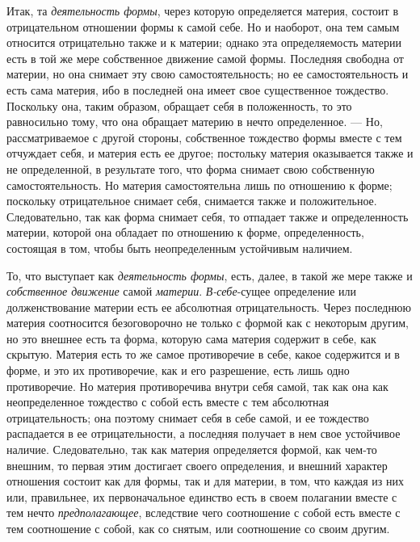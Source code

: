 Итак, та {\em деятельность формы}, через которую
определяется материя, состоит в отрицательном отношении формы к самой себе.
Но и наоборот, она тем самым относится отрицательно также и к материи;
однако эта определяемость материи есть в той же мере собственное движение
самой формы. Последняя свободна от материи, но она снимает эту свою
самостоятельность; но ее самостоятельность и есть сама материя, ибо в
последней она имеет свое существенное тождество. Поскольку она, таким
образом, обращает себя в положенность, то это равносильно тому, что она
обращает материю в нечто определенное. — Но, рассматриваемое с другой
стороны, собственное тождество формы вместе с тем отчуждает себя, и материя
есть ее другое; постольку материя оказывается также и не определенной, в
результате того, что форма снимает свою собственную самостоятельность. Но
материя самостоятельна лишь по отношению к форме; поскольку отрицательное
снимает себя, снимается также и положительное. Следовательно, так как форма
снимает себя, то отпадает также и определенность материи, которой она
обладает по отношению к форме, определенность, состоящая в том, чтобы быть
неопределенным устойчивым наличием.

То, что выступает как {\em деятельность формы}, есть,
далее, в такой же мере также и {\em собственное
движение} самой {\em материи}.
{\em В-себе}{}-сущее определение или долженствование
материи есть ее абсолютная отрицательность. Через последнюю материя
соотносится безоговорочно не только с формой как с некоторым другим, но это
внешнее есть та форма, которую сама материя содержит в себе, как скрытую.
Материя есть то же самое противоречие в себе, какое содержится и в форме, и
это их противоречие, как и его разрешение, есть лишь одно противоречие. Но
материя противоречива внутри себя самой, так как она как неопределенное
тождество с собой есть вместе с тем абсолютная отрицательность; она поэтому
снимает себя в себе самой, и ее тождество распадается в ее отрицательности,
а последняя получает в нем свое устойчивое наличие. Следовательно, так как
материя определяется формой, как чем-то внешним, то первая этим достигает
своего определения, и внешний характер отношения состоит как для формы, так
и для материи, в том, что каждая из них или, правильнее, их первоначальное
единство есть в своем полагании вместе с тем нечто
{\em предполагающее}, вследствие чего соотношение с
собой есть вместе с тем соотношение с собой, как со снятым, или соотношение
со своим другим.

